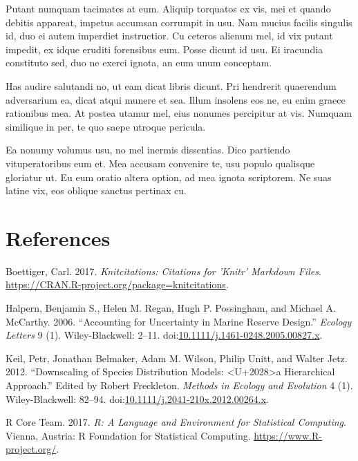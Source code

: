 \documentclass[]{article}
\begin{document}
Putant numquam tacimates at eum. Aliquip torquatos ex vis, mei et quando
debitis appareat, impetus accumsan corrumpit in usu. Nam mucius facilis
singulis id, duo ei autem imperdiet instructior. Cu ceteros alienum mel,
id vix putant impedit, ex idque eruditi forensibus eum. Posse dicunt id
usu. Ei iracundia constituto sed, duo ne exerci ignota, an eum unum
conceptam.

Has audire salutandi no, ut eam dicat libris dicunt. Pri hendrerit
quaerendum adversarium ea, dicat atqui munere et sea. Illum insolens eos
ne, eu enim graece rationibus mea. At postea utamur mel, eius nonumes
percipitur at vis. Numquam similique in per, te quo saepe utroque
pericula.

Ea nonumy volumus usu, no mel inermis dissentias. Dico partiendo
vituperatoribus eum et. Mea accusam convenire te, usu populo qualisque
gloriatur ut. Eu eum oratio altera option, ad mea ignota scriptorem. Ne
suas latine vix, eos oblique sanctus pertinax cu.

\section*{References}\label{references}

\hypertarget{refs}{}
\hypertarget{ref-Boettiger_2017}{}
Boettiger, Carl. 2017. \emph{Knitcitations: Citations for 'Knitr'
Markdown Files}. \url{https://CRAN.R-project.org/package=knitcitations}.

\hypertarget{ref-Halpern_2006}{}
Halpern, Benjamin S., Helen M. Regan, Hugh P. Possingham, and Michael A.
McCarthy. 2006. ``Accounting for Uncertainty in Marine Reserve Design.''
\emph{Ecology Letters} 9 (1). Wiley-Blackwell: 2--11.
doi:\href{https://doi.org/10.1111/j.1461-0248.2005.00827.x}{10.1111/j.1461-0248.2005.00827.x}.

\hypertarget{ref-Keil_2012}{}
Keil, Petr, Jonathan Belmaker, Adam M. Wilson, Philip Unitt, and Walter
Jetz. 2012. ``Downscaling of Species Distribution Models:
\textless{}U+2028\textgreater{}a Hierarchical Approach.'' Edited by
Robert Freckleton. \emph{Methods in Ecology and Evolution} 4 (1).
Wiley-Blackwell: 82--94.
doi:\href{https://doi.org/10.1111/j.2041-210x.2012.00264.x}{10.1111/j.2041-210x.2012.00264.x}.

\hypertarget{ref-R_Core_Team_2017}{}
R Core Team. 2017. \emph{R: A Language and Environment for Statistical
Computing}. Vienna, Austria: R Foundation for Statistical Computing.
\url{https://www.R-project.org/}.
\end{document}
